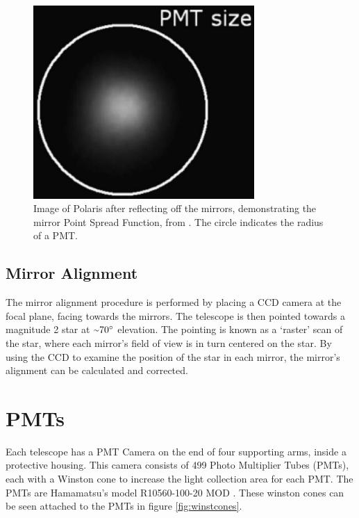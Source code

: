 \begin{figure}[ht]
  \centering
  \includegraphics[width=0.75\textwidth]{images/mirror_polaris.eps}
  \caption[Polaris PSF]{
    Image of Polaris after reflecting off the mirrors, demonstrating the mirror Point Spread Function, from \cite{Veritas_Detector}.
    The circle indicates the radius of a PMT.}
  \label{fig:mirrorpolaris}
\end{figure}

\subsection{Mirror Alignment}
The mirror alignment procedure is performed by placing a CCD camera at the focal plane, facing towards the mirrors.
The telescope is then pointed towards a magnitude 2 star at $ \nicetilde \ang{70} $ elevation.
The pointing is known as a `raster' scan of the star, where each mirror's field of view is in turn centered on the star.
By using the CCD to examine the position of the star in each mirror, the mirror's alignment can be calculated and corrected.



\section{PMTs}\label{sec:pmts}

Each telescope has a PMT Camera on the end of four supporting arms, inside a protective housing.
This camera consists of 499 Photo Multiplier Tubes (PMTs), each with a Winston cone to increase the light collection area for each PMT.
The PMTs are Hamamatsu's model R10560-100-20 MOD \cite{pmtmodels}.
These winston cones can be seen attached to the PMTs in figure \ref{fig:winstcones}.


